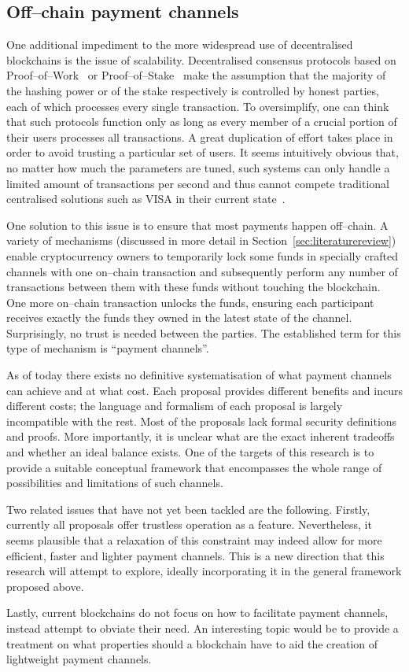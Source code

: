 \subsection{Off--chain payment channels}
  One additional impediment to the more widespread use of decentralised blockchains is the
  issue of scalability. Decentralised consensus protocols based on
  Proof--of--Work~\cite{hashcash} or Proof--of--Stake~\cite{ouroboros} make the assumption
  that the majority of the hashing power or of the stake respectively is controlled by
  honest parties, each of which processes every single transaction. To oversimplify, one
  can think that such protocols function only as long as every member of a crucial portion
  of their users processes all transactions. A great duplication of effort takes place in
  order to avoid trusting a particular set of users. It seems intuitively obvious that, no
  matter how much the parameters are tuned, such systems can only handle a limited amount
  of transactions per second and thus cannot compete traditional centralised solutions
  such as VISA in their current state~\cite{tps}.

  One solution to this issue is to ensure that most payments happen off--chain. A variety
  of mechanisms (discussed in more detail in Section~\ref{sec:literaturereview}) enable
  cryptocurrency owners to temporarily lock some funds in specially crafted channels with
  one on--chain transaction and subsequently perform any number of transactions between
  them with these funds without touching the blockchain. One more on--chain transaction
  unlocks the funds, ensuring each participant receives exactly the funds they owned in
  the latest state of the channel. Surprisingly, no trust is needed between the parties.
  The established term for this type of mechanism is ``payment channels''.

  As of today there exists no definitive systematisation of what payment channels can
  achieve and at what cost. Each proposal provides different benefits and incurs different
  costs; the language and formalism of each proposal is largely incompatible with the
  rest. Most of the proposals lack formal security definitions and proofs. More
  importantly, it is unclear what are the exact inherent tradeoffs and whether an ideal
  balance exists. One of the targets of this research is to provide a suitable conceptual
  framework that encompasses the whole range of possibilities and limitations of such
  channels.

  Two related issues that have not yet been tackled are the following. Firstly, currently
  all proposals offer trustless operation as a feature. Nevertheless, it seems plausible
  that a relaxation of this constraint may indeed allow for more efficient, faster and
  lighter payment channels. This is a new direction that this research will attempt to
  explore, ideally incorporating it in the general framework proposed above.

  Lastly, current blockchains do not focus on how to facilitate payment channels, instead
  attempt to obviate their need. An interesting topic would be to provide a treatment on
  what properties should a blockchain have to aid the creation of lightweight payment
  channels.
